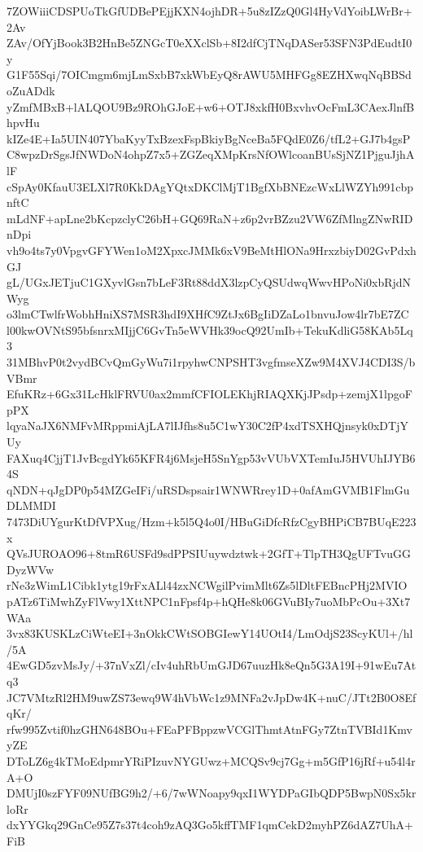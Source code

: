 7ZOWiiiCDSPUoTkGfUDBePEjjKXN4ojhDR+5u8zIZzQ0Gl4HyVdYoibLWrBr+2Av
ZAv/OfYjBook3B2HnBe5ZNGcT0eXXclSb+8I2dfCjTNqDASer53SFN3PdEudtI0y
G1F55Sqi/7OICmgm6mjLmSxbB7xkWbEyQ8rAWU5MHFGg8EZHXwqNqBBSdoZuADdk
yZmfMBxB+lALQOU9Bz9ROhGJoE+w6+OTJ8xkfH0BxvhvOcFmL3CAexJlnfBhpvHu
kIZe4E+Ia5UIN407YbaKyyTxBzexFspBkiyBgNceBa5FQdE0Z6/tfL2+GJ7b4gsP
C8wpzDrSgsJfNWDoN4ohpZ7x5+ZGZeqXMpKrsNfOWlcoanBUsSjNZ1PjguJjhAlF
cSpAy0KfauU3ELXl7R0KkDAgYQtxDKClMjT1BgfXbBNEzcWxLlWZYh991cbpnftC
mLdNF+apLne2bKcpzclyC26bH+GQ69RaN+z6p2vrBZzu2VW6ZfMlngZNwRIDnDpi
vh9o4ts7y0VpgvGFYWen1oM2XpxcJMMk6xV9BeMtHlONa9HrxzbiyD02GvPdxhGJ
gL/UGxJETjuC1GXyvlGsn7bLeF3Rt88ddX3lzpCyQSUdwqWwvHPoNi0xbRjdNWyg
o3lmCTwlfrWobhHniXS7MSR3hdI9XHfC9ZtJx6BgIiDZaLo1bnvuJow4lr7bE7ZC
l00kwOVNtS95bfsnrxMIjjC6GvTn5eWVHk39ocQ92UmIb+TekuKdliG58KAb5Lq3
31MBhvP0t2vydBCvQmGyWu7i1rpyhwCNPSHT3vgfmseXZw9M4XVJ4CDI3S/bVBmr
EfuKRz+6Gx31LcHklFRVU0ax2mmfCFIOLEKhjRIAQXKjJPsdp+zemjX1lpgoFpPX
lqyaNaJX6NMFvMRppmiAjLA7lIJfhs8u5C1wY30C2fP4xdTSXHQjnsyk0xDTjYUy
FAXuq4CjjT1JvBcgdYk65KFR4j6MsjeH5SnYgp53vVUbVXTemIuJ5HVUhIJYB64S
qNDN+qJgDP0p54MZGeIFi/uRSDspsair1WNWRrey1D+0afAmGVMB1FlmGuDLMMDI
7473DiUYgurKtDfVPXug/Hzm+k5l5Q4o0I/HBuGiDfcRfzCgyBHPiCB7BUqE223x
QVsJUROAO96+8tmR6USFd9sdPPSIUuywdztwk+2GfT+TlpTH3QgUFTvuGGDyzWVw
rNe3zWimL1Cibk1ytg19rFxALl44zxNCWgilPvimMlt6Zs5lDltFEBncPHj2MVIO
pATz6TiMwhZyFlVwy1XttNPC1nFpsf4p+hQHe8k06GVuBIy7uoMbPcOu+3Xt7WAa
3vx83KUSKLzCiWteEI+3nOkkCWtSOBGIewY14UOtI4/LmOdjS23ScyKUl+/hl/5A
4EwGD5zvMsJy/+37nVxZl/cIv4uhRbUmGJD67uuzHk8eQn5G3A19I+91wEu7Atq3
JC7VMtzRl2HM9uwZS73ewq9W4hVbWc1z9MNFa2vJpDw4K+nuC/JTt2B0O8EfqKr/
rfw995Zvtif0hzGHN648BOu+FEaPFBppzwVCGlThmtAtnFGy7ZtnTVBId1KmvyZE
DToLZ6g4kTMoEdpmrYRiPIzuvNYGUwz+MCQSv9cj7Gg+m5GfP16jRf+u54l4rA+O
DMUjI0szFYF09NUfBG9h2/+6/7wWNoapy9qxI1WYDPaGIbQDP5BwpN0Sx5krloRr
dxYYGkq29GnCe95Z7s37t4coh9zAQ3Go5kffTMF1qmCekD2myhPZ6dAZ7UhA+FiB
